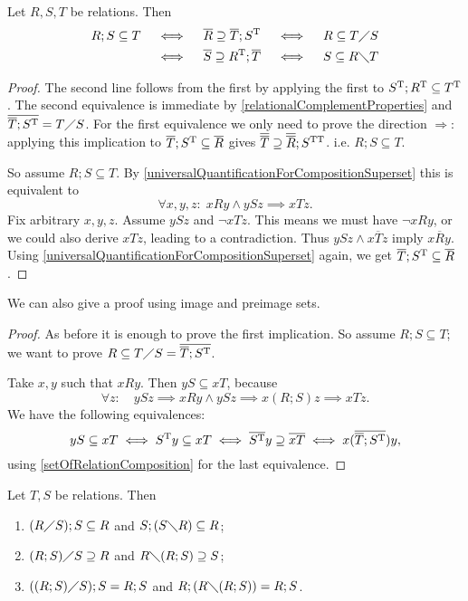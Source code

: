 \begin{proposition} \label{SchroderRule}
Let $R,S,T$ be relations. Then
\begin{align*}
R;S \subseteq T &\quad\iff\quad \overline{R} \supseteq \overline{T};S^{\mathrm{T}} \quad\iff\quad R \subseteq T\diagup S \\
&\quad\iff\quad \overline{S} \supseteq R^{\mathrm{T}} ; \overline{T} \quad\iff\quad S \subseteq R\diagdown T
\end{align*}
\end{proposition}
\begin{proof}
The second line follows from the first by applying the first to $S^{\mathrm{T}};R^{\mathrm{T}} \subseteq T^{\mathrm{T}}$. The second equivalence is immediate by \ref{relationalComplementProperties} and $\overline{\overline{T};S^{\mathrm{T}}} = T\diagup S$. For the first equivalence we only need to prove the direction $\Rightarrow$: applying this implication to $\overline{T};S^{\mathrm{T}} \subseteq \overline{R}$ gives $\overline{\overline{T}}\supseteq \overline{\overline{R}};S^{\mathrm{T}\mathrm{T}}$. i.e. $R;S \subseteq T$.

So assume $R;S \subseteq T$. By \ref{universalQuantificationForCompositionSuperset} this is equivalent to
\[ \forall x,y,z:\; xRy \land ySz \implies xTz. \]
Fix arbitrary $x,y,z$. Assume $ySz$ and $\neg xTz$. This means we must have $\neg xRy$, or we could also derive $xTz$, leading to a contradiction. Thus $ySz \land x\overline{T}z$ imply $x\overline{R}y$. Using \ref{universalQuantificationForCompositionSuperset} again, we get $\overline{T};S^{\mathrm{T}} \subseteq \overline{R}$.
\end{proof}
We can also give a proof using image and preimage sets.
\begin{proof}
As before it is enough to prove the first implication. So assume $R;S \subseteq T$; we want to prove $R \subseteq T\diagup S = \overline{\overline{T}; S^{\mathrm{T}}}$.

Take $x,y$ such that $xRy$. Then $yS \subseteq xT$, because
\[ \forall z: \quad ySz \implies xRy\land ySz \implies x(R;S)z \implies xTz. \]
We have the following equivalences:
\[ yS \subseteq xT \iff S^{\mathrm{T}} y \subseteq xT \iff \overline{S^{\mathrm{T}}}y \supseteq \overline{xT} \iff x(\overline{\overline{T}; S^{\mathrm{T}}})y, \]
using \ref{setOfRelationComposition} for the last equivalence.
\end{proof}
\begin{corollary} \label{GaloisConnectionFromSchroderRule}
Let $T,S$ be relations. Then
\begin{enumerate}
\item $(R\diagup S);S \subseteq R$ and $S;(S\diagdown R) \subseteq R$;
\item $(R;S)\diagup S \supseteq R$ and $R\diagdown (R;S) \supseteq S$;
\item $((R;S)\diagup S);S = R;S$ and $R;(R\diagdown(R;S)) = R;S$.
\end{enumerate}
\end{corollary}
